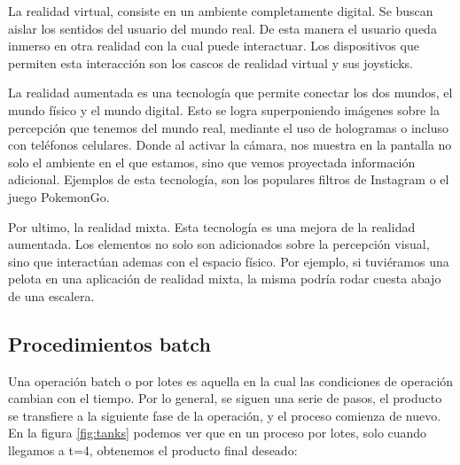 
La realidad virtual, consiste en un ambiente completamente digital. Se buscan aislar los sentidos del usuario del mundo real. De esta manera el usuario queda inmerso en otra realidad con la cual puede interactuar. Los dispositivos que permiten esta interacción son los cascos de realidad virtual y sus joysticks.

La realidad aumentada es una tecnología que permite conectar los dos mundos, el mundo físico y el mundo digital. Esto se logra superponiendo imágenes sobre la percepción que tenemos del mundo real, mediante el uso de hologramas o incluso con teléfonos celulares. Donde al activar la cámara, nos muestra en la pantalla no solo el ambiente en el que estamos, sino que vemos proyectada información adicional. Ejemplos de esta tecnología, son los populares filtros de Instagram o el juego PokemonGo.

Por ultimo, la realidad mixta. Esta tecnología es una mejora de la realidad aumentada. Los elementos no solo son adicionados sobre la percepción visual, sino que interactúan ademas con el espacio físico. Por ejemplo, si tuviéramos una pelota en una aplicación de realidad mixta, la misma podría rodar cuesta abajo de una escalera.


\subsection{Procedimientos batch}

Una operación batch o por lotes es aquella en la cual las condiciones de operación cambian con el tiempo. Por lo general, se siguen una serie de pasos, el producto se transfiere a la siguiente fase de la operación, y el proceso comienza de nuevo. En la figura \ref{fig:tanks} podemos ver que en un proceso por lotes, solo cuando llegamos a t=4, obtenemos el producto final deseado:\\

